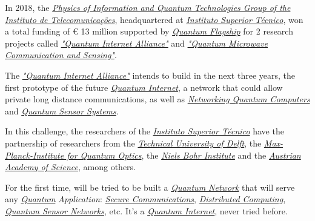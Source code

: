 \documentclass[conference]{IEEEtran}
\begin{document}
\vspace{4pt}

In 2018, the \href{https://www.it.pt/}{\textit{Physics of Information and Quantum Technologies Group of the Instituto de Telecomunica\c{c}\"oes}}, headquartered at \href{https://tecnico.ulisboa.pt/}{\textit{Instituto Superior T\'ecnico}}, won a total funding of \euro\hspace{0.05mm} 13 million supported by \href{https://qt.eu/}{\textit{Quantum Flagship}} for 2 research projects called \href{http://quantum-internet.team/}{\textit{"Quantum Internet Alliance"}} and \href{https://ec.europa.eu/digital-single-market/en/content/qmics-quantum-microwave-communication-and-sensing}{\textit{"Quantum Microwave Communication and Sensing"}}.

\vspace{4pt}

The \href{http://quantum-internet.team/}{\textit{"Quantum Internet Alliance"}} intends to build in the next three years, the first prototype of the future \href{https://en.wikipedia.org/wiki/Quantum_network#Quantum_internet}{\textit{Quantum Internet}}, a network that could allow private long distance communications, as well as \href{https://en.wikipedia.org/wiki/Quantum_network}{\textit{Networking Quantum Computers}} and \href{https://en.wikipedia.org/wiki/Quantum_sensor}{\textit{Quantum Sensor Systems}}.

\vspace{4pt}

In this challenge, the researchers of the \href{https://tecnico.ulisboa.pt/}{\textit{Instituto Superior T\'ecnico}} have the partnership of researchers from the \href{https://www.tudelft.nl/}{\textit{Technical University of Delft}}, the \href{https://www.mpq.mpg.de/}{\textit{Max-Planck-Institute for Quantum Optics}}, the \href{https://www.nbi.ku.dk/}{\textit{Niels Bohr Institute}} and the \href{https://www.oeaw.ac.at/}{\textit{Austrian Academy of Science}}, among others.

\newpage

For the first time, will be tried to be built a \href{https://en.wikipedia.org/wiki/Quantum_network}{\textit{Quantum Network}} that will serve any \href{https://en.wikipedia.org/wiki/Quantum}{\textit{Quantum}} \textit{Application}: \href{https://en.wikipedia.org/wiki/Secure_communication}{\textit{Secure Communications}}, \href{https://en.wikipedia.org/wiki/Distributed_computing}{\textit{Distributed Computing}}, \href{https://en.wikipedia.org/wiki/Quantum_sensor}{\textit{Quantum Sensor Networks}}, etc. It's a \href{https://en.wikipedia.org/wiki/Quantum_network#Quantum_internet}{\textit{Quantum Internet}}, never tried before.
\end{document}

